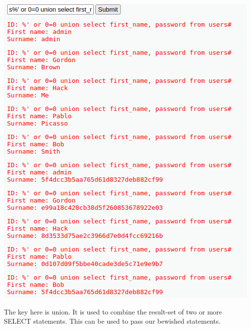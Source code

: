 \documentclass[a4paper,10pt]{article}
\begin{document}
\begin{center}
 \includegraphics[scale=0.5]{sec.png}
\end{center}
The key here is union. It is used to combine the result-set of two or more SELECT statements. This can be used to pass our bewished statements.
\end{document}
